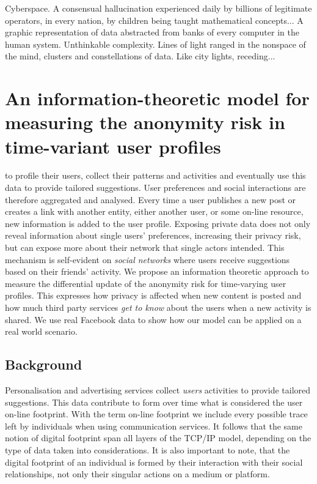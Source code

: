 \begin{savequote}[75mm]
Cyberspace. A consensual hallucination experienced daily by billions of legitimate operators, in every nation, by children being taught mathematical concepts... A graphic representation of data abstracted from banks of every computer in the human system. Unthinkable complexity. Lines of light ranged in the nonspace of the mind, clusters and constellations of data. Like city lights, receding...
\end{savequote}

\chapter{An information-theoretic model for measuring the anonymity risk in time-variant user profiles}

 to profile their users, collect their patterns and activities and eventually use this data to provide tailored suggestions. User preferences and social interactions are therefore aggregated and analysed. Every time a user publishes a new post or creates a link with another entity, either another user, or some on-line resource, new information is added to the user profile. Exposing private data does not only reveal information about single users' preferences, increasing their privacy risk, but can expose more about their network that single actors intended. This mechanism is self-evident on \emph{social networks} where users receive suggestions based on their friends' activity.
We propose an information theoretic approach to measure the differential update of the anonymity risk for time-varying user profiles. This expresses how privacy is affected when new content is posted and how much third party services \emph{get to know} about the users when a new activity is shared. We use real Facebook data to show how our model can be applied on a real world scenario.

\section{Background}

Personalisation and advertising services collect \emph{users} activities to provide tailored suggestions. This data contribute to form over time what is considered the user on-line footprint. With the term on-line footprint we include every possible trace left by individuals when using communication services. It follows that the same notion of digital footprint span all layers of the TCP/IP model, depending on the type of data taken into considerations. It is also important to note, that the digital footprint of an individual is formed by their interaction with their social relationships, not only their singular actions on a medium or platform.

